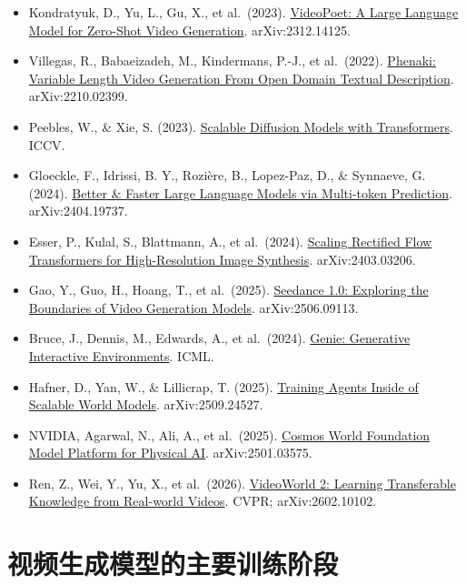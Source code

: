\vspace{0.25em}
\begin{itemize}
\tightlist
\item
  Kondratyuk, D., Yu, L., Gu, X., et al.~(2023). \href{https://arxiv.org/abs/2312.14125}{VideoPoet: A Large Language Model for Zero-Shot Video Generation}. arXiv:2312.14125.
\item
  Villegas, R., Babaeizadeh, M., Kindermans, P.-J., et al.~(2022). \href{https://arxiv.org/abs/2210.02399}{Phenaki: Variable Length Video Generation From Open Domain Textual Description}. arXiv:2210.02399.
\item
  Peebles, W., \& Xie, S. (2023). \href{https://arxiv.org/abs/2212.09748}{Scalable Diffusion Models with Transformers}. ICCV.
\item
  Gloeckle, F., Idrissi, B. Y., Rozière, B., Lopez-Paz, D., \& Synnaeve, G. (2024). \href{https://arxiv.org/abs/2404.19737}{Better \& Faster Large Language Models via Multi-token Prediction}. arXiv:2404.19737.
\item
  Esser, P., Kulal, S., Blattmann, A., et al.~(2024). \href{https://arxiv.org/abs/2403.03206}{Scaling Rectified Flow Transformers for High-Resolution Image Synthesis}. arXiv:2403.03206.
\item
  Gao, Y., Guo, H., Hoang, T., et al.~(2025). \href{https://arxiv.org/abs/2506.09113}{Seedance 1.0: Exploring the Boundaries of Video Generation Models}. arXiv:2506.09113.
\item
  Bruce, J., Dennis, M., Edwards, A., et al.~(2024). \href{https://arxiv.org/abs/2402.15391}{Genie: Generative Interactive Environments}. ICML.
\item
  Hafner, D., Yan, W., \& Lillicrap, T. (2025). \href{https://arxiv.org/abs/2509.24527}{Training Agents Inside of Scalable World Models}. arXiv:2509.24527.
\item
  NVIDIA, Agarwal, N., Ali, A., et al.~(2025). \href{https://arxiv.org/abs/2501.03575}{Cosmos World Foundation Model Platform for Physical AI}. arXiv:2501.03575.
\item
  Ren, Z., Wei, Y., Yu, X., et al.~(2026). \href{https://arxiv.org/abs/2602.10102}{VideoWorld 2: Learning Transferable Knowledge from Real-world Videos}. CVPR; arXiv:2602.10102.
\end{itemize}

\clearpage

\hypertarget{ux89c6ux9891ux751fux6210ux6a21ux578bux7684ux4e3bux8981ux8badux7ec3ux9636ux6bb5}{%
\section{视频生成模型的主要训练阶段}\label{ux89c6ux9891ux751fux6210ux6a21ux578bux7684ux4e3bux8981ux8badux7ec3ux9636ux6bb5}}

